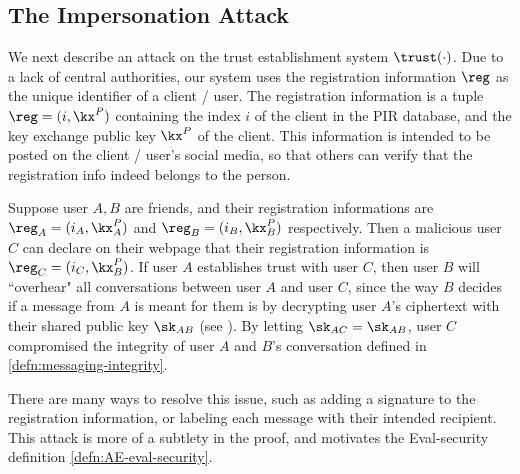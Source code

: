 \subsection{The Impersonation Attack} 
We next describe an attack on the trust establishment system $\trust(\cdot)$. Due to a lack of central authorities, our system uses the registration information $\reg$ as the unique identifier of a client / user. The registration information is a tuple $\reg = (i, \kx^P)$ containing the index $i$ of the client in the PIR database, and the key exchange public key $\kx^P$ of the client. This information is intended to be posted on the client / user's social media, so that others can verify that the registration info indeed belongs to the person.

Suppose user $A, B$ are friends, and their registration informations are $\reg_A = (i_A, \kx^P_A)$ and $\reg_B = (i_B, \kx^P_B)$ respectively. Then a malicious user $C$ can declare on their webpage that their registration information is $\reg_C = (i_C, \kx^P_B)$. If user $A$ establishes trust with user $C$, then user $B$ will ``overhear" all conversations between user $A$ and user $C$, since the way $B$ decides if a message from $A$ is meant for them is by decrypting user $A$'s ciphertext with their shared public key $\sk_{AB}$ (see \cite[Figure 3]{whitepaper}). By letting $\sk_{AC} = \sk_{AB}$, user $C$ compromised the integrity of user $A$ and $B$'s conversation defined in \cref{defn:messaging-integrity}.

There are many ways to resolve this issue, such as adding a signature to the registration information, or labeling each message with their intended recipient. This attack is more of a subtlety in the proof, and motivates the Eval-security definition \cref{defn:AE-eval-security}.